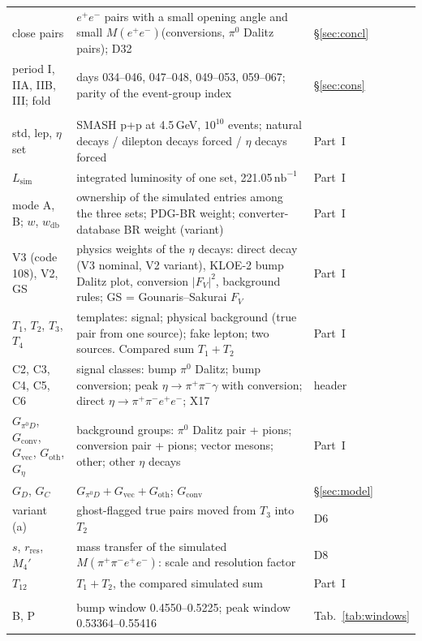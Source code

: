 \documentclass[11pt,a4paper]{article}
\newcommand{\piz}{\ensuremath{\pi^{0}}\xspace}
\newcommand{\ee}{\ensuremath{e^{+}e^{-}}\xspace}
\newcommand{\pipi}{\ensuremath{\pi^{+}\pi^{-}}\xspace}
\newcommand{\ppee}{\ensuremath{\pi^{+}\pi^{-}e^{+}e^{-}}\xspace}
\newcommand{\Mfour}{\ensuremath{M(\pi^{+}\pi^{-}e^{+}e^{-})}\xspace}
\newcommand{\Mee}{\ensuremath{M(e^{+}e^{-})}\xspace}
\newcommand{\nbinv}{\ensuremath{\mathrm{nb}^{-1}}\xspace}
\newcommand{\GeVcc}{\ensuremath{\mathrm{GeV}/c^{2}}\xspace}
\newcommand{\Lsim}{\ensuremath{L_{\mathrm{sim}}}\xspace}
\newcommand{\Geta}{\ensuremath{G_\eta}\xspace}
\begin{document}
{\begin{longtable}{@{}>{\raggedright\arraybackslash}p{3.0cm} >{\raggedright\arraybackslash}p{\dimexpr\textwidth-3.0cm-2.0cm-4\tabcolsep\relax} >{\raggedright\arraybackslash}p{2.0cm}@{}}
close pairs & \ee pairs with a small opening angle and small \Mee (conversions, \piz Dalitz pairs); D32 & \S\ref{sec:concl} \\
period I, IIA, IIB, III; fold & days 034--046, 047--048, 049--053, 059--067; parity of the event-group index & \S\ref{sec:cons} \\
\midrule
\multicolumn{3}{@{}l}{\textbf{Simulation}} \\
std, lep, $\eta$ set & SMASH p+p at 4.5\,GeV, $10^{10}$ events; natural decays / dilepton decays forced / $\eta$ decays forced & Part~I \\
\Lsim & integrated luminosity of one set, 221.05\,\nbinv & Part~I \\
mode A, B; $w$, $w_{\mathrm{db}}$ & ownership of the simulated entries among the three sets; PDG-BR weight; converter-database BR weight (variant) & Part~I \\
V3 (code 108), V2, GS & physics weights of the $\eta$ decays: direct decay (V3 nominal, V2 variant), KLOE-2 bump Dalitz plot, conversion $|F_V|^2$, background rules; GS = Gounaris--Sakurai $F_V$ & Part~I \\
$T_1$, $T_2$, $T_3$, $T_4$ & templates: signal; physical background (true pair from one source); fake lepton; two sources. Compared sum $T_1+T_2$ & Part~I \\
C2, C3, C4, C5, C6 & signal classes: bump \piz Dalitz; bump conversion; peak $\eta\to\pipi\gamma$ with conversion; direct $\eta\to\ppee$; X17 & header \\
$G_{\pi^0D}$, $G_{\mathrm{conv}}$, $G_{\mathrm{vec}}$, $G_{\mathrm{oth}}$, \Geta & background groups: \piz Dalitz pair + pions; conversion pair + pions; vector mesons; other; other $\eta$ decays & Part~I \\
$G_D$, $G_C$ & $G_{\pi^0D}+G_{\mathrm{vec}}+G_{\mathrm{oth}}$; $G_{\mathrm{conv}}$ & \S\ref{sec:model} \\
variant (a) & ghost-flagged true pairs moved from $T_3$ into $T_2$ & D6 \\
$s$, $r_{\mathrm{res}}$, $M_4'$ & mass transfer of the simulated \Mfour: scale and resolution factor & D8 \\
$T_{12}$ & $T_1+T_2$, the compared simulated sum & Part~I \\
\midrule
\multicolumn{3}{@{}l}{\textbf{Windows, layouts and control regions} (\Mfour on the data scale, \GeVcc)} \\
B, P & bump window 0.4550--0.5225; peak window 0.53364--0.55416 & Tab.~\ref{tab:windows} \\

\end{longtable}}
\end{document}
